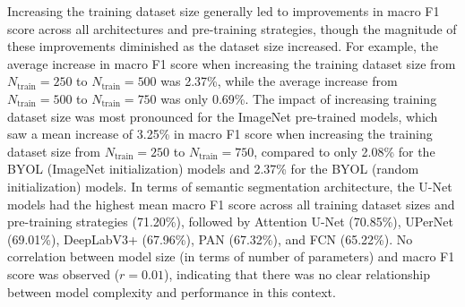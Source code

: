 Increasing the training dataset size generally led to improvements in macro F1 score across all architectures and pre-training strategies, though the magnitude of these improvements diminished as the dataset size increased.
For example, the average increase in macro F1 score when increasing the training dataset size from \(N_\text{train} = 250\) to \(N_\text{train} = 500\) was \num{2.37}\%, while the average increase from \(N_\text{train} = 500\) to \(N_\text{train} = 750\) was only \num{0.69}\%.
The impact of increasing training dataset size was most pronounced for the ImageNet pre-trained models, which saw a mean increase of \num{3.25}\% in macro F1 score when increasing the training dataset size from \(N_\text{train} = 250\) to \(N_\text{train} = 750\), compared to only \num{2.08}\% for the BYOL (ImageNet initialization) models and \num{2.37}\% for the BYOL (random initialization) models.
In terms of semantic segmentation architecture, the U-Net models had the highest mean macro F1 score across all training dataset sizes and pre-training strategies (71.20\%), followed by Attention U-Net (70.85\%), UPerNet (69.01\%), DeepLabV3+ (67.96\%), PAN (67.32\%), and FCN (65.22\%).
No correlation between model size (in terms of number of parameters) and macro F1 score was observed (\(r = 0.01\)), indicating that there was no clear relationship between model complexity and performance in this context.



